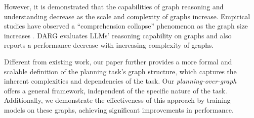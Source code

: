 


However, it is demonstrated that the capabilities of graph reasoning and understanding decrease as the scale and complexity of graphs increase. 
Empirical studies have observed a ``comprehension collapse'' phenomenon as the graph size increases \cite{Sui2023TableML, Cao2024GraphInsightUI}.
DARG \cite{zhang2024dargdynamicevaluationlarge} evaluates LLMs' reasoning capability on graphs and also reports a performance decrease with increasing complexity of graphs. 


Different from existing work, our paper further provides a more formal and scalable definition of the planning task's graph structure, which captures the inherent complexities and dependencies of the task. Our \textit{planning-over-graph} offers a general framework, independent of the specific nature of the task. Additionally, we demonstrate the effectiveness of this approach by training models on these graphs, achieving significant improvements in performance.